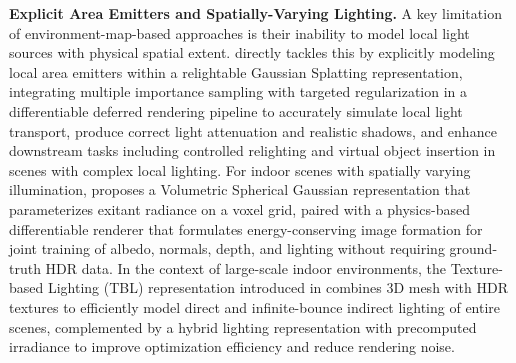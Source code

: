 \documentclass[11pt]{article}
\begin{document}
\textbf{Explicit Area Emitters and Spatially-Varying Lighting.} A key limitation of environment-map-based approaches is their inability to model local light sources with physical spatial extent. \cite{ref584} directly tackles this by explicitly modeling local area emitters within a relightable Gaussian Splatting representation, integrating multiple importance sampling with targeted regularization in a differentiable deferred rendering pipeline to accurately simulate local light transport, produce correct light attenuation and realistic shadows, and enhance downstream tasks including controlled relighting and virtual object insertion in scenes with complex local lighting. For indoor scenes with spatially varying illumination, \cite{ref585} proposes a Volumetric Spherical Gaussian representation that parameterizes exitant radiance on a voxel grid, paired with a physics-based differentiable renderer that formulates energy-conserving image formation for joint training of albedo, normals, depth, and lighting without requiring ground-truth HDR data. In the context of large-scale indoor environments, the Texture-based Lighting (TBL) representation introduced in \cite{ref586} combines 3D mesh with HDR textures to efficiently model direct and infinite-bounce indirect lighting of entire scenes, complemented by a hybrid lighting representation with precomputed irradiance to improve optimization efficiency and reduce rendering noise.
\end{document}
